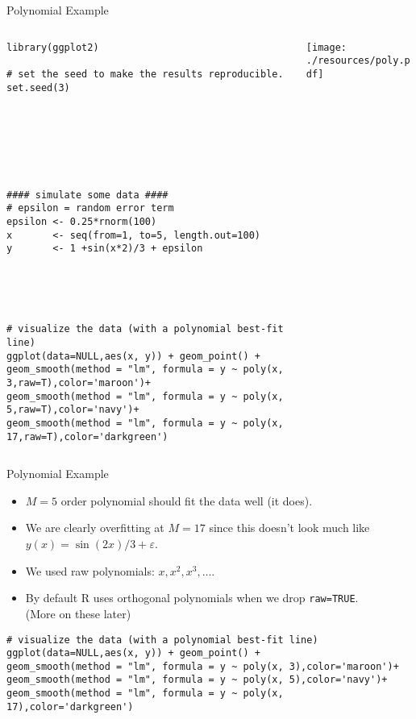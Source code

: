 \begin{frame}[fragile]{Polynomial Example}
\begin{columns}
\begin{column}{0.5\textwidth}
 \tiny
\begin{verbatim}
library(ggplot2)    

# set the seed to make the results reproducible.
set.seed(3)







#### simulate some data ####
# epsilon = random error term
epsilon <- 0.25*rnorm(100)
x       <- seq(from=1, to=5, length.out=100)
y       <- 1 +sin(x*2)/3 + epsilon





# visualize the data (with a polynomial best-fit line)
ggplot(data=NULL,aes(x, y)) + geom_point() + 
geom_smooth(method = "lm", formula = y ~ poly(x, 3,raw=T),color='maroon')+
geom_smooth(method = "lm", formula = y ~ poly(x, 5,raw=T),color='navy')+
geom_smooth(method = "lm", formula = y ~ poly(x, 17,raw=T),color='darkgreen')
\end{verbatim}
\end{column}
\begin{column}{0.5\textwidth}  %
    \begin{center}
    \texttt{[image: ./resources/poly.pdf]}
     \end{center}
\end{column}
\end{columns}
\end{frame}

\begin{frame}[fragile]{Polynomial Example}
\begin{itemize}
\item $M=5$ order polynomial should fit the data well (it does).
\item We are clearly \alert{overfitting} at $M=17$ since this doesn't look much like $y(x) = \sin(2x)/3 + \varepsilon$.
\item We used \alert{raw polynomials}: $x,x^2,x^3,\ldots$.
\item By default R uses \alert{orthogonal polynomials} when we drop \texttt{raw=TRUE}.\\
(More on these later)
\end{itemize}
\tiny 
\begin{verbatim}
# visualize the data (with a polynomial best-fit line)
ggplot(data=NULL,aes(x, y)) + geom_point() + 
geom_smooth(method = "lm", formula = y ~ poly(x, 3),color='maroon')+
geom_smooth(method = "lm", formula = y ~ poly(x, 5),color='navy')+
geom_smooth(method = "lm", formula = y ~ poly(x, 17),color='darkgreen')
\end{verbatim}
\end{frame}

